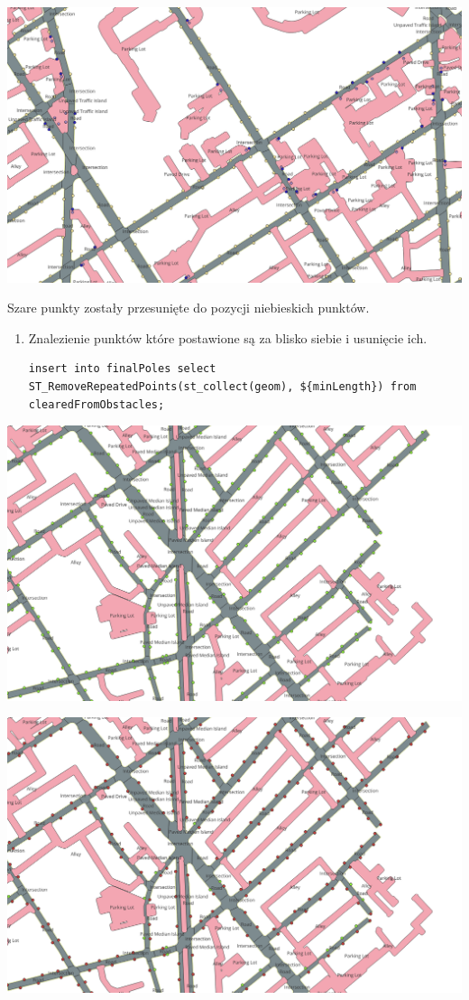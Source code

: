 \documentclass[11pt]{article}
\begin{document}
\begin{center}
\includegraphics[width=.9\linewidth]{./img/7.png}
\end{center}

Szare punkty zostały przesunięte do pozycji niebieskich punktów.

\begin{enumerate}
\item Znalezienie punktów które postawione są za blisko siebie i usunięcie ich.

\begin{verbatim}
insert into finalPoles select ST_RemoveRepeatedPoints(st_collect(geom), ${minLength}) from clearedFromObstacles;
\end{verbatim}
\end{enumerate}

\begin{center}
\includegraphics[width=.9\linewidth]{./img/8.png}
\end{center}

\begin{center}
\includegraphics[width=.9\linewidth]{./img/9.png}
\end{center}
\end{document}
